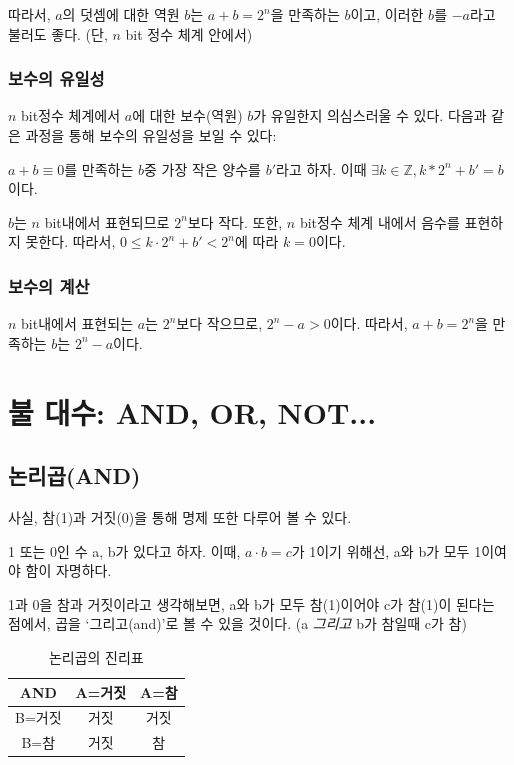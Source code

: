 \documentclass[a4paper,12pt]{book}
\begin{document}
\begin{appendices}
따라서, $a$의 덧셈에 대한 역원 $b$는 $a + b = 2^n$을 만족하는 $b$이고,
이러한 $b$를 $-a$라고 불러도 좋다. (단, $n$ bit 정수 체계 안에서)

\subsubsection{보수의 유일성}

$n$ bit정수 체계에서 $a$에 대한 보수(역원) $b$가 유일한지 의심스러울 수 있다.
다음과 같은 과정을 통해 보수의 유일성을 보일 수 있다:

$a + b \equiv 0$를 만족하는 $b$중 가장 작은 양수를 $b'$라고 하자.
이때 $\exists k \in \mathbb{Z}, k*2^n + b' = b$이다.

$b$는 $n$ bit내에서 표현되므로 $2^n$보다 작다.
또한, $n$ bit정수 체계 내에서 음수를 표현하지 못한다.
따라서, $0 \le k \cdot 2^n + b' < 2^n$에 따라 $k = 0$이다.

\subsubsection{보수의 계산}

$n$ bit내에서 표현되는 $a$는 $2^n$보다 작으므로,
$2^n - a > 0$이다.
따라서, $a + b = 2^n$을 만족하는 $b$는 $2^n - a$이다.

\section{불 대수: AND, OR, NOT...}

\subsection{논리곱(AND)}

사실, 참(1)과 거짓(0)을 통해 명제 또한 다루어 볼 수 있다.

1 또는 0인 수 a, b가 있다고 하자.
이때, $a \cdot b = c$가 1이기 위해선,
a와 b가 모두 1이여야 함이 자명하다.

1과 0을 참과 거짓이라고 생각해보면,
a와 b가 모두 참(1)이어야 c가 참(1)이 된다는 점에서,
곱을 `그리고(and)'로 볼 수 있을 것이다.
({a \textit{그리고} b}가 참일때 c가 참)


\begin{table}[H]
    \centering

    \caption{논리곱의 진리표}

    \begin{tabular}{ || c || c | c || }
        \hline
        AND   & A=거짓 & A=참 \\
        \hline\hline
        B=거짓 &   거짓 & 거짓 \\
        \hline
        B=참   &  거짓 &   참 \\
        \hline
    \end{tabular}
\end{table}


\end{appendices}
\end{document}
